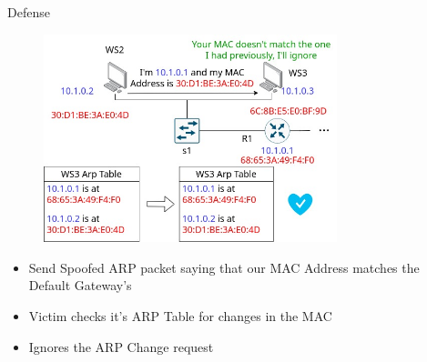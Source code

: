 \documentclass{beamer}
\begin{document}
\begin{frame}
\begin{columns}
\begin{column}{0.5\textwidth}
    \end{column}
    \begin{column}{0.5\textwidth}
        \Large Defense
        \begin{figure}
            \centering
            \includegraphics[width=0.8\textwidth]{arp_defense.jpg}\\
        \end{figure}
            \begin{itemize}[label={}]
                \item \footnotesize Send Spoofed ARP packet saying that our MAC Address matches the Default Gateway's
                \item \footnotesize Victim checks it's ARP Table for changes in the MAC
                \item \footnotesize Ignores the ARP Change request
            \end{itemize}
    \end{column}
\end{columns}
\end{frame}
\end{document}
